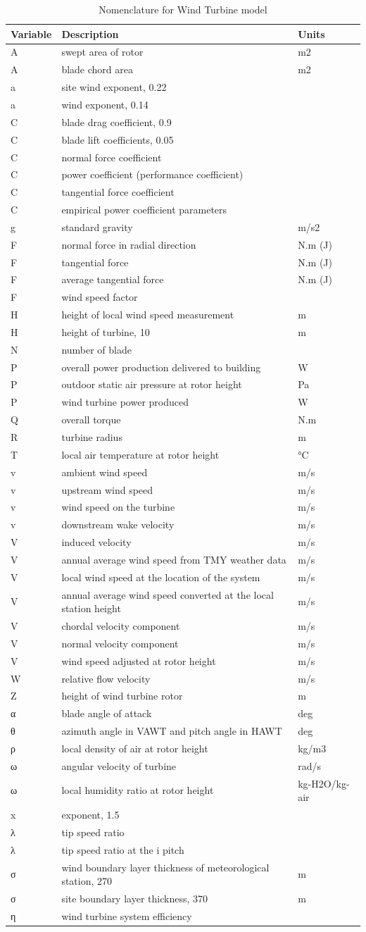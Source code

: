 \begin{longtable}[c]{p{1.5in}p{3.0in}p{1.5in}}
\caption{Nomenclature for Wind Turbine model \protect \label{table:nomenclature-for-wind-turbine-model}}\\
\toprule 
Variable & Description & Units \tabularnewline \midrule
\endhead
A & swept area of rotor & m2 \tabularnewline
A & blade chord area & m2 \tabularnewline
a & site wind exponent, 0.22 & ~ \tabularnewline
a & wind exponent, 0.14 & ~ \tabularnewline
C & blade drag coefficient, 0.9 & ~ \tabularnewline
C & blade lift coefficients, 0.05 & ~ \tabularnewline
C & normal force coefficient & ~ \tabularnewline
C & power coefficient (performance coefficient) & ~ \tabularnewline
C & tangential force coefficient & ~ \tabularnewline
C & empirical power coefficient parameters & ~ \tabularnewline
g & standard gravity & m/s2 \tabularnewline
F & normal force in radial direction & N.m (J) \tabularnewline
F & tangential force & N.m (J) \tabularnewline
F & average tangential force & N.m (J) \tabularnewline
F & wind speed factor & ~ \tabularnewline
H & height of local wind speed measurement & m \tabularnewline
H & height of turbine, 10 & m \tabularnewline
N & number of blade & ~ \tabularnewline
P & overall power production delivered to building~ & W \tabularnewline
P & outdoor static air pressure at rotor height & Pa \tabularnewline
P & wind turbine power produced & W \tabularnewline
Q & overall torque & N.m \tabularnewline
R & turbine radius & m \tabularnewline
T & local air temperature at rotor height & °C \tabularnewline
v & ambient wind speed & m/s \tabularnewline
v & upstream wind speed & m/s \tabularnewline
v & wind speed on the turbine & m/s \tabularnewline
v & downstream wake velocity & m/s \tabularnewline
V & induced velocity & m/s \tabularnewline
V & annual average wind speed from TMY weather data & m/s \tabularnewline
V & local wind speed at the location of the system & m/s \tabularnewline
V & annual average wind speed converted at the local station height & m/s \tabularnewline
V & chordal velocity component & m/s \tabularnewline
V & normal velocity component & m/s \tabularnewline
V & wind speed adjusted at rotor height & m/s \tabularnewline
W & relative flow velocity & m/s \tabularnewline
Z & height of wind turbine rotor & m \tabularnewline
α & blade angle of attack & deg \tabularnewline
θ & azimuth angle in VAWT and pitch angle in HAWT & deg \tabularnewline
ρ & local density of air at rotor height & kg/m3 \tabularnewline
ω & angular velocity of turbine & rad/s \tabularnewline
ω & local humidity ratio at rotor height & kg-H2O/kg-air \tabularnewline
x & exponent, 1.5 & ~ \tabularnewline
λ & tip speed ratio & ~ \tabularnewline
λ & tip speed ratio at the i   pitch & ~ \tabularnewline
σ & wind boundary layer thickness of meteorological station, 270 & m \tabularnewline
σ & site boundary layer thickness, 370 & m \tabularnewline
η & wind turbine system efficiency & ~ \tabularnewline
\bottomrule
\end{longtable}

